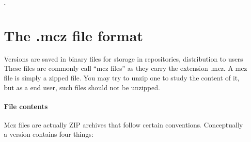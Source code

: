 \documentclass[a4paper,10pt,twoside]{book}
\begin{document}



. 




\section{The .mcz file format}

Versions are saved in binary files for storage in repositories, distribution to users \etc
These files are commonly call ``mcz files'' as they carry the extension .mcz. A mcz file is simply a zipped file. You may try to unzip one to study the content of it, but as a end user, such files should not be unzipped.


\paragraph{File contents}
Mcz files are actually ZIP archives that follow certain conventions. Conceptually a version contains four things:
\end{document}
